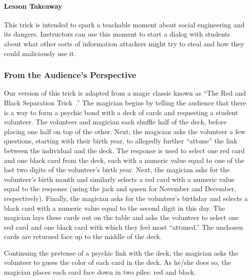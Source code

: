 \paragraph{Lesson Takeaway}
This trick is intended to spark a teachable moment about
social engineering and
its dangers.
Instructors can use this moment to start a dialog with
students about what other
sorts of information attackers might try to steal and
how they could maliciously use it.

\subsubsection{From the Audience's Perspective}

Our version of this trick is adapted from a magic classic
known as ``The Red and Black Separation Trick~\cite{redblackseparation}.''
The magician begins by
telling the audience that there
is a way to form a psychic bond with a deck of cards
and requesting a student volunteer.
The volunteer and magician
each shuffle half of the deck, before  placing one half
on top of the other.
Next, the magician asks the volunteer
a few questions, starting with their birth year,
to allegedly further ``attune''
the link between the individual and the deck.
The response
is used to select one red card and one black card from the deck,
each with a numeric value equal to one of the last two digits of
the volunteer's birth year.
Next, the magician asks for the volunteer's birth month and similarly selects
a red card with a numeric value equal
to the response (using the jack and queen for November and December,
respectively).
Finally, the magician asks
for the volunteer's birthday and selects a black card with a numeric value
equal to the second digit in this day.
The magician lays these cards out on the table and asks the volunteer to select
one red card and one black card with which they feel most ``attuned.''
The unchosen cards are returned face up to the middle
of the deck.

Continuing the pretense of a psychic link with the deck, the magician asks the volunteer to
guess the color of each card in the deck.  As he/she does so, the magician
places each card face down in two piles: red and black.

